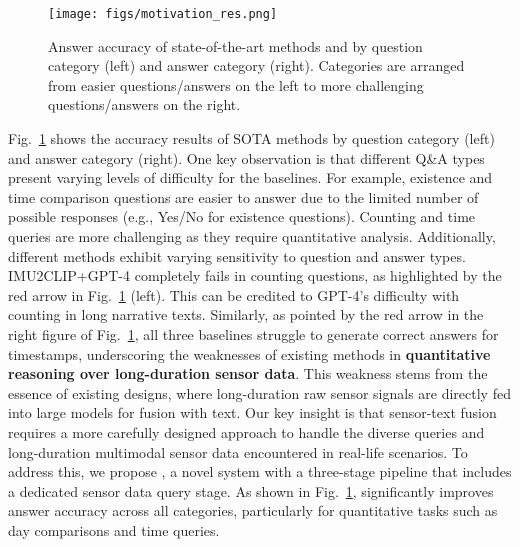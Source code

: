 



\begin{figure}[t]
\begin{center}
\texttt{[image: figs/motivation\_res.png]} 
\vspace{-4mm}
\caption{Answer accuracy of state-of-the-art methods and \Method by question category (left) and answer category (right).  Categories are arranged from easier questions/answers on the left to more challenging questions/answers on the right.}
\label{fig:variants}
\end{center}
\vspace{-4mm}
\end{figure}

Fig.~\ref{fig:variants} shows the accuracy results of SOTA methods by question category (left) and answer category (right).
One key observation is that different Q\&A types present varying levels of difficulty for the baselines.
For example, existence and time comparison questions are easier to answer due to the limited number of possible responses (e.g., Yes/No for existence questions).
Counting and time queries are more challenging as they require quantitative analysis.
Additionally, different methods exhibit varying sensitivity to question and answer types.
IMU2CLIP+GPT-4 completely fails in counting questions, as highlighted by the red arrow in Fig.~\ref{fig:variants} (left).
This can be credited to GPT-4's difficulty with counting in long narrative texts.
Similarly, as pointed by the red arrow in the right figure of Fig.~\ref{fig:variants}, all three baselines struggle to generate correct answers for timestamps, underscoring the weaknesses of existing methods in \textbf{quantitative reasoning over long-duration sensor data}.
This weakness stems from the essence of existing designs, where long-duration raw sensor signals are directly fed into large models for fusion with text. Our key insight is that sensor-text fusion requires a more carefully designed approach to handle the diverse queries and long-duration multimodal sensor data encountered in real-life scenarios. To address this, we propose \Method, a novel system with a three-stage pipeline that includes a dedicated sensor data query stage. As shown in Fig.~\ref{fig:variants}, \Method significantly improves answer accuracy across all categories, particularly for quantitative tasks such as day comparisons and time queries.


